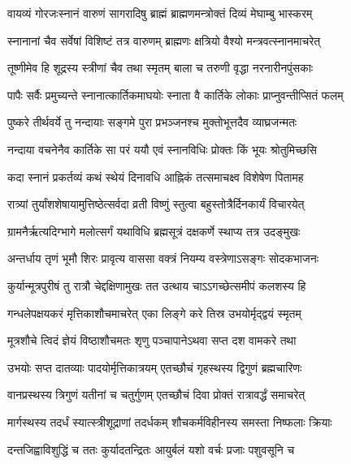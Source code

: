\twolineshloka
{वायव्यं गोरजःस्नानं वारुणं सागरादिषु}
{ब्राह्मं ब्राह्मणमन्त्रोक्तं दिव्यं मेघाम्बु भास्करम्} %

\twolineshloka
{स्नानानां चैव सर्वेषां विशिष्टं तत्र वारुणम्}
{ब्राह्मणः क्षत्रियो वैश्यो मन्त्रवत्स्नानमाचरेत्} %

\twolineshloka
{तूष्णीमेव हि शूद्रस्य स्त्रीणां चैव तथा स्मृतम्}
{बाला च तरुणी वृद्धा नरनारीनपुंसकाः} %

\twolineshloka
{पापैः सर्वैः प्रमुच्यन्ते स्नानात्कार्तिकमाघयोः}
{स्नाता वै कार्तिके लोकाः प्राप्नुवन्तीप्सितं फलम्} %

\twolineshloka
{पुष्करे तीर्थवर्ये तु नन्दायाः सङ्गमे पुरा}
{प्रभञ्जनश्च मुक्तोभूत्तदैव व्याघ्रजन्मतः} %

\twolineshloka
{नन्दाया वचनेनैव कार्तिके सा परं ययौ}
{एवं स्नानविधिः प्रोक्तः किं भूयः श्रोतुमिच्छसि} %





\twolineshloka
{कदा स्नानं प्रकर्तव्यं कथं स्थेयं दिनावधि}
{आह्निकं तत्समाचक्ष्व विशेषेण पितामह} %

\twolineshloka
{रात्र्यां तुर्यांशशेषायामुत्तिष्ठेत्सर्वदा व्रती}
{विष्णुं स्तुत्वा बहुस्तोत्रैर्दिनकार्यं विचारयेत्} %

\twolineshloka
{ग्रामनैर्ऋत्यदिग्भागे मलोत्सर्गं यथाविधि}
{ब्रह्मसूत्रं दक्षकर्णे स्थाप्य तत्र उदङ्मुखः} %

\twolineshloka
{अन्तर्धाय तृणं भूमौ शिरः प्रावृत्य वाससा}
{वक्त्रं नियम्य वस्त्रेणाऽसङ्गः सोदकभाजनः} %

\twolineshloka
{कुर्यान्मूत्रपुरीषं तु रात्रौ चेद्दक्षिणामुखः}
{तत उत्थाय चाऽऽगच्छेत्समीपं कलशस्य हि} %

\twolineshloka
{गन्धलेपक्षयकरं मृत्तिकाशौचमाचरेत्}
{एका लिङ्गे करे तिस्र उभयोर्मृद्द्वयं स्मृतम्} %

\twolineshloka
{मूत्रशौचे त्विदं ज्ञेयं विष्ठाशौचमतः शृणु}
{पञ्चापानेऽथवा सप्त दश वामकरे तथा} %

\twolineshloka
{उभयोः सप्त दातव्याः पादयोर्मृत्तिकात्रयम्}
{एतच्छौचं गृहस्थस्य द्विगुणं ब्रह्मचारिणः} %

\twolineshloka
{वानप्रस्थस्य त्रिगुणं यतीनां च चतुर्गुणम्}
{एतच्छौचं दिवा प्रोक्तं रात्रावर्द्धं समाचरेत्} %

\twolineshloka
{मार्गस्थस्य तदर्धं स्यात्स्त्रीशूद्राणां तदर्धकम्}
{शौचकर्मविहीनस्य समस्ता निष्फलाः क्रियाः} %

\twolineshloka
{दन्तजिह्वाविशुद्धिं च ततः कुर्यादतन्द्रितः}
{आयुर्बलं यशो वर्चः प्रजाः पशुवसूनि च} %

